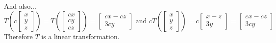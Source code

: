 \documentclass[10pt,]{book}
\theoremstyle{ptxplainnotitle}
\theoremstyle{ptxplaintitle}
\theoremstyle{ptxdefinitionnotitle}
\theoremstyle{ptxdefinitiontitle}
\theoremstyle{ptxdefinitionnotitle}
\theoremstyle{ptxdefinitiontitle}
\theoremstyle{ptxdefinitionnotitle}
\theoremstyle{ptxdefinitiontitle}
\theoremstyle{ptxdefinitionnotitle}
\theoremstyle{ptxdefinitiontitle}
\begin{document}
\begin{example}
\begin{equation*}
\end{equation*}
\hypertarget{p-9}{}%
And also...%
%
\begin{equation*}
T\left(c\begin{bmatrix} x \\ y \\ z \end{bmatrix} \right)
=
T\left(\begin{bmatrix} cx \\ cy \\ cz \end{bmatrix} \right)
=
\begin{bmatrix} cx-cz \\ 3cy \end{bmatrix}
\text{ and }
cT\left(\begin{bmatrix} x \\ y \\ z \end{bmatrix} \right)
=
c\begin{bmatrix} x-z \\ 3y \end{bmatrix}
=
\begin{bmatrix} cx-cz \\ 3cy \end{bmatrix}
\end{equation*}
\hypertarget{p-10}{}%
Therefore \(T\) is a linear transformation.%
\end{example}
\end{document}
